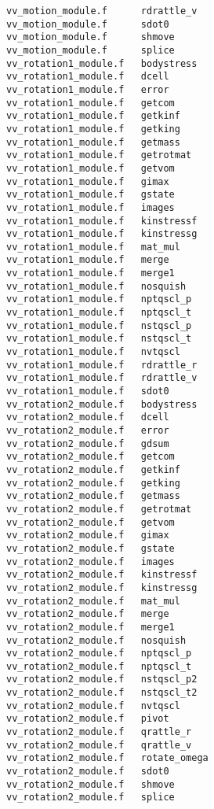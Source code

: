\begin{verbatim}
vv_motion_module.f      rdrattle_v                
vv_motion_module.f      sdot0                     
vv_motion_module.f      shmove                    
vv_motion_module.f      splice                    
vv_rotation1_module.f   bodystress                
vv_rotation1_module.f   dcell                     
vv_rotation1_module.f   error                     
vv_rotation1_module.f   getcom                    
vv_rotation1_module.f   getkinf                   
vv_rotation1_module.f   getking                   
vv_rotation1_module.f   getmass                   
vv_rotation1_module.f   getrotmat                 
vv_rotation1_module.f   getvom                    
vv_rotation1_module.f   gimax                     
vv_rotation1_module.f   gstate                    
vv_rotation1_module.f   images                    
vv_rotation1_module.f   kinstressf                
vv_rotation1_module.f   kinstressg                
vv_rotation1_module.f   mat_mul                   
vv_rotation1_module.f   merge                     
vv_rotation1_module.f   merge1                    
vv_rotation1_module.f   nosquish                  
vv_rotation1_module.f   nptqscl_p                 
vv_rotation1_module.f   nptqscl_t                 
vv_rotation1_module.f   nstqscl_p                 
vv_rotation1_module.f   nstqscl_t                 
vv_rotation1_module.f   nvtqscl                   
vv_rotation1_module.f   rdrattle_r                
vv_rotation1_module.f   rdrattle_v                
vv_rotation1_module.f   sdot0                     
vv_rotation2_module.f   bodystress                
vv_rotation2_module.f   dcell                     
vv_rotation2_module.f   error                     
vv_rotation2_module.f   gdsum                     
vv_rotation2_module.f   getcom                    
vv_rotation2_module.f   getkinf                   
vv_rotation2_module.f   getking                   
vv_rotation2_module.f   getmass                   
vv_rotation2_module.f   getrotmat                 
vv_rotation2_module.f   getvom                    
vv_rotation2_module.f   gimax                     
vv_rotation2_module.f   gstate                    
vv_rotation2_module.f   images                    
vv_rotation2_module.f   kinstressf                
vv_rotation2_module.f   kinstressg                
vv_rotation2_module.f   mat_mul                   
vv_rotation2_module.f   merge                     
vv_rotation2_module.f   merge1                    
vv_rotation2_module.f   nosquish                  
vv_rotation2_module.f   nptqscl_p                 
vv_rotation2_module.f   nptqscl_t                 
vv_rotation2_module.f   nstqscl_p2                
vv_rotation2_module.f   nstqscl_t2                
vv_rotation2_module.f   nvtqscl                   
vv_rotation2_module.f   pivot                     
vv_rotation2_module.f   qrattle_r                 
vv_rotation2_module.f   qrattle_v                 
vv_rotation2_module.f   rotate_omega              
vv_rotation2_module.f   sdot0                     
vv_rotation2_module.f   shmove                    
vv_rotation2_module.f   splice                    
\end{verbatim}
